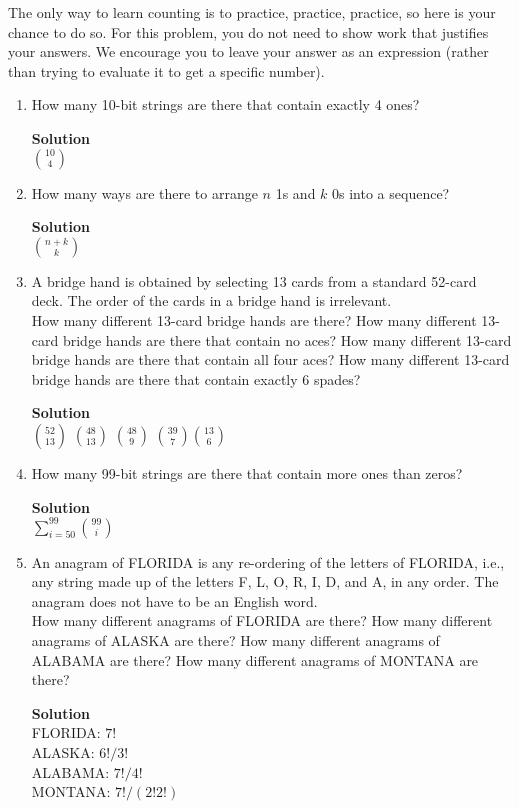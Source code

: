 \documentclass[11pt]{article}
\newenvironment{Parts}{\begin{enumerate}[label=(\alph*)]}{\end{enumerate}}
\newcommand*{\Part}{\item}
\begin{document}
The only way to learn counting is to practice, practice, practice, so
here is your chance to do so.
For this problem, you do not need to show work that justifies your answers.
We encourage you to leave your answer as an expression (rather than
trying to evaluate it to get a specific number).
\begin{Parts}
\Part How many 10-bit strings are there that contain exactly 4 ones?
\begin{mdframed} \textbf{Solution} \\
$\binom{10}{4}$
\end{mdframed}

\Part How many ways are there to arrange $n$ 1s and $k$ 0s into a sequence?
\begin{mdframed} \textbf{Solution} \\
$\binom{n+k}{k}$
\end{mdframed}

\Part A bridge hand is obtained by selecting 13 cards from a standard
  52-card deck. The order of the cards in a bridge hand is
  irrelevant. \\
  How many different 13-card bridge hands are there? 
  How many different 13-card bridge hands are there that contain
  no aces? How many different 13-card bridge hands are there that contain
  all four aces? How many different 13-card bridge hands are there that contain
  exactly 6 spades?
\begin{mdframed} \textbf{Solution} \\
$\binom{52}{13}$
$\binom{48}{13}$
$\binom{48}{9}$
$\binom{39}{7}\binom{13}{6}$
\end{mdframed}

\Part How many 99-bit strings are there that contain more ones than
  zeros?
\begin{mdframed} \textbf{Solution} \\
$\sum^{99}_{i=50}\binom{99}{i}$
\end{mdframed}
 
\Part An anagram of FLORIDA is any re-ordering of the letters of FLORIDA, i.e., any
  string made up of the letters F, L, O, R, I, D, and A, in any order.
  The anagram does not have to be an English word. \\
  How many different anagrams of FLORIDA are there? How many different anagrams 
  of ALASKA are there? How many different anagrams of ALABAMA are there? 
  How many different anagrams of MONTANA are there?
\begin{mdframed} \textbf{Solution} \\
FLORIDA: $7!$ \\
ALASKA: $6!/3!$ \\
ALABAMA: $7!/4!$ \\
MONTANA: $7!/(2!2!)$
\end{mdframed}


\end{Parts}
\end{document}
